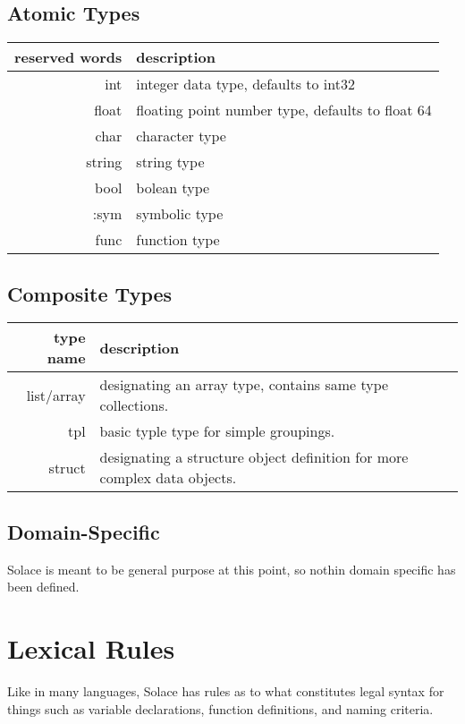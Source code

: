 \documentclass{article}
\begin{document}
\subsection{Atomic Types}
\begin{center}
\begin{tabular}{|r|l|}
	\hline
	reserved words & description \\
	\hline
	\hline
	int & integer data type, defaults to int32 \\
	float & floating point number type, defaults to float 64 \\
	char & character type \\
	string & string type \\
	bool & bolean type \\
	:sym & symbolic type \\
	func & function type \\
	\hline
\end{tabular}
\end{center}

\subsection{Composite Types}
\begin{center}
\begin{tabular}{|r|l|}
	\hline
	type name & description \\
	\hline
	\hline
	list/array & designating an array type, contains same type collections. \\
	tpl & basic typle type for simple groupings. \\
	struct & designating a structure object definition for more complex data objects. \\
	\hline
\end{tabular}
\end{center}

\subsection{Domain-Specific}
Solace is meant to be general purpose at this point, so nothin domain specific has been defined.


\section{Lexical Rules}
Like in many languages, Solace has rules as to what constitutes legal syntax for things such as
variable declarations, function definitions, and naming criteria.
\end{document}
